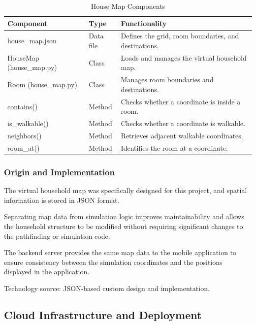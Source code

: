 \documentclass[conference]{IEEEtran}
\newlength{\tablebodywidth}
\begin{document}
\begin{table}[!t]
\caption{House Map Components}
\label{tab:t23}
\centering\footnotesize
\setlength{\tabcolsep}{3pt}
\setlength{\tablebodywidth}{\dimexpr\columnwidth-18pt\relax}
\begin{tabular}{>{\raggedright\arraybackslash}p{0.370\tablebodywidth}>{\raggedright\arraybackslash}p{0.200\tablebodywidth}>{\raggedright\arraybackslash}p{0.430\tablebodywidth}}
\toprule
\textbf{Component} & \textbf{Type} & \textbf{Functionality} \\
\midrule
house\_\allowbreak{}map.json & Data file & Defines the grid, room boundaries, and destinations. \\
HouseMap (house\_\allowbreak{}map.py) & Class & Loads and manages the virtual household map. \\
Room (house\_\allowbreak{}map.py) & Class & Manages room boundaries and destinations. \\
contains() & Method & Checks whether a coordinate is inside a room. \\
is\_\allowbreak{}walkable() & Method & Checks whether a coordinate is walkable. \\
neighbors() & Method & Retrieves adjacent walkable coordinates. \\
room\_\allowbreak{}at() & Method & Identifies the room at a coordinate. \\
\bottomrule
\end{tabular}
\end{table}

\subsubsection{Origin and Implementation}

The virtual household map was specifically designed for this project, and spatial information is stored in JSON format.

Separating map data from simulation logic improves maintainability and allows the household structure to be modified without requiring significant changes to the pathfinding or simulation code.

The backend server provides the same map data to the mobile application to ensure consistency between the simulation coordinates and the positions displayed in the application.

Technology source: JSON-based custom design and implementation.

\subsection{Cloud Infrastructure and Deployment \cite{ref14,ref17,ref18,ref19,ref20}}
\end{document}

